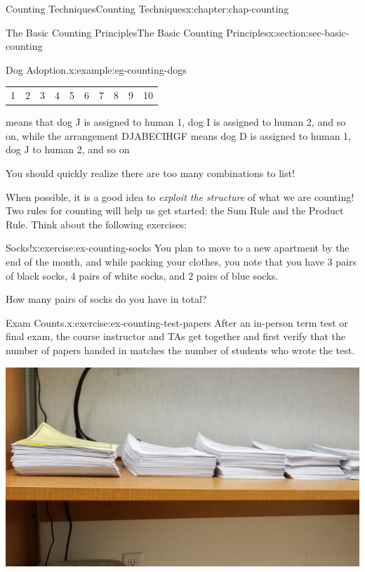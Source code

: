 \documentclass[oneside,10pt,]{book}
\numberwithin{equation}{section}
\begin{document}
\begin{chapterptx}{Counting Techniques}{}{Counting Techniques}{}{}{x:chapter:chap-counting}
\begin{sectionptx}{The Basic Counting Principles}{}{The Basic Counting Principles}{}{}{x:section:sec-basic-counting}
\begin{example}{Dog Adoption.}{x:example:eg-counting-dogs}
\begin{sidebyside}{1}{0.1}{0.1}{0}
\begin{sbspanel}{0.8}
{{\begin{tabular}{llllllllll}
1&2&3&4&5&6&7&8&9&10
\end{tabular}
}%
\par}
\end{sbspanel}%
\end{sidebyside}%
\par
means that dog J is assigned to human 1, dog I is assigned to human 2, and so on, while the arrangement DJABECIHGF means dog D is assigned to human 1, dog J to human 2, and so on\textellipsis{}%
\par
You should quickly realize there are too many combinations to list!%
\end{example}
When possible, it is a good idea to \emph{exploit the structure} of what we are counting! Two rules for counting will help us get started: the Sum Rule and the Product Rule. Think about the following exercises:%
\begin{inlineexercise}{Socks!}{x:exercise:ex-counting-socks}%
You plan to move to a new apartment by the end of the month, and while packing your clothes, you note that you have 3 pairs of black socks, 4 pairs of white socks, and 2 pairs of blue socks.%
\par
How many pairs of socks do you have in total?%
\end{inlineexercise}
\begin{inlineexercise}{Exam Counts.}{x:exercise:ex-counting-test-papers}%
After an in-person term test or final exam, the course instructor and TAs get together and first verify that the number of papers handed in matches the number of students who wrote the test.%
\begin{sidebyside}{1}{0.25}{0.25}{0}%
\begin{sbspanel}{0.5}%
\includegraphics[width=\linewidth]{figs/test-papers.jpg}
\end{sbspanel}%
\end{sidebyside}%

\end{inlineexercise}
\end{sectionptx}
\end{chapterptx}
\end{document}

